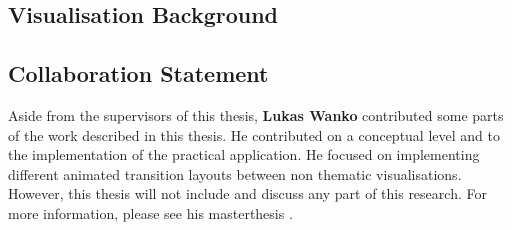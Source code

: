 \subsection{Visualisation Background}


\subsection{Collaboration Statement}
\label{s:collaboration-statement}
Aside from the supervisors of this thesis, \textbf{Lukas Wanko} contributed some parts of the work described in this thesis. He contributed on a conceptual level and to the implementation of the practical application. He focused on implementing different animated transition layouts between non thematic visualisations. However, this thesis will not include and discuss any part of this research. For more information, please see his masterthesis .